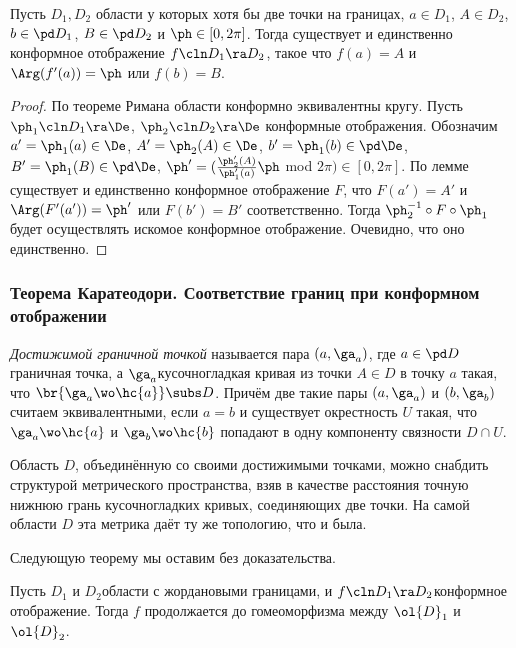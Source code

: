 \documentclass[a4paper]{article}
\begin{document}
\begin{theorem}
Пусть $D_1,D_2$ \т области у которых хотя бы две точки на границах, $a\in D_1$, $A\in D_2$, $b\in\pd D_1$, $B\in\pd D_2$ и $\ph\in[0,2\pi]$. Тогда существует и единственно конформное отображение $f\cln D_1 \ra D_2$, такое что $f(a) = A$ и  $\Arg(f'(a))=\ph$ или $f(b)=B$.
\end{theorem}
\begin{proof}
По теореме Римана области конформно эквивалентны кругу. Пусть $\ph_1\cln D_1 \ra \De$, $\ph_2\cln D_2 \ra \De$ \т конформные отображения. Обозначим $a'=\ph_1(a)\in \De$, $A'=\ph_2(A)\in \De$, $b'=\ph_1(b)\in\pd \De$, $B'=\ph_1(B)\in\pd \De$, $\ph'=(\frac{\ph'_2(A)}{\ph'_1(a)}\ph$ mod $2\pi) \in[0,2\pi]$. По лемме существует и единственно конформное отображение $F$, что $F(a') = A'$ и  $\Arg(F'(a'))=\ph'$ или $F(b')=B'$ соответственно. Тогда $\ph_2^{-1}\circ F\circ \ph_1$ будет осуществлять искомое конформное отображение. Очевидно, что оно единственно.
\end{proof}


\subsubsection{Теорема Каратеодори. Соответствие границ при конформном отображении}

\begin{df}
\emph{Достижимой граничной точкой} называется пара $(a,\ga_a)$, где $a\in\pd D$\т граничная точка, а
$\ga_a$\т кусочно\д гладкая кривая из точки $A \in D$ в точку $a$ такая, что $\br{\ga_a \wo \hc{a}}\subs D$.
Причём две такие пары $(a,\ga_a)$ и $(b,\ga_b)$ считаем эквивалентными, если $a=b$
и существует окрестность $U$ такая, что $\ga_a \wo \hc{a}$ и $\ga_b \wo \hc{b}$ попадают в одну компоненту
связности $D\cap U$.
\end{df}

\begin{note}
Область $D$, объединённую со своими достижимыми точками, можно снабдить
структурой метрического пространства, взяв в качестве расстояния точную нижнюю грань
кусочно\д гладких кривых, соединяющих две точки.
На самой области $D$ эта метрика даёт ту же топологию, что и была.
\end{note}

Следующую теорему мы оставим без доказательства.
\begin{theorem}[Каратеодори]
Пусть $D_1$ и $D_2$\т области с жордановыми границами, и
$f\cln D_1\ra D_2$\т конформное отображение. Тогда $f$ продолжается до гомеоморфизма между $\ol{D}_1$ и $\ol{D}_2$.
\end{theorem}
\end{document}
